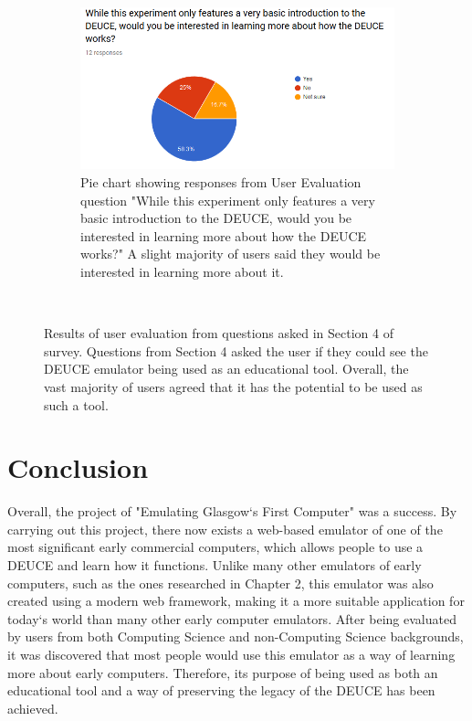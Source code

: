 \documentclass{l4proj}
\begin{document}
\begin{figure}[t]
\begin{subfigure}[t]{0.45\textwidth}
		\includegraphics[width=\textwidth]{images/chart-7}
		\caption{Pie chart showing responses from User Evaluation question "While this experiment only features a very basic introduction to the DEUCE, would you be interested in learning more about how the DEUCE works?" A slight majority of users said they would be interested in learning more about it.}
		\label{fig:chart-7}
	\end{subfigure}
	~ %
	\caption{Results of user evaluation from questions asked in Section 4 of survey. Questions from Section 4 asked the user if they could see the DEUCE emulator being used as an educational tool. Overall, the vast majority of users agreed that it has the potential to be used as such a tool.}
	\label{fig:eval-usability}
\end{figure}



\chapter{Conclusion}    
Overall, the project of "Emulating Glasgow`s First Computer" was a success. By carrying out this project, there now exists a web-based emulator of one of the most significant early commercial computers, which allows people to use a DEUCE and learn how it functions. Unlike many other emulators of early computers, such as the ones researched in Chapter 2, this emulator was also created using a modern web framework, making it a more suitable application for today`s world than many other early computer emulators. After being evaluated by users from both Computing Science and non-Computing Science backgrounds, it was discovered that most people would use this emulator as a way of learning more about early computers. Therefore, its purpose of being used as both an educational tool and a way of preserving the legacy of the DEUCE has been achieved. 
\end{document}
